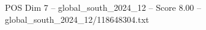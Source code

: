 \begin{textsample}{POS Dim 7 – global\_south\_2024\_12 – Score 8.00 – global\_south\_2024\_12/118648304.txt}
\end{textsample}
